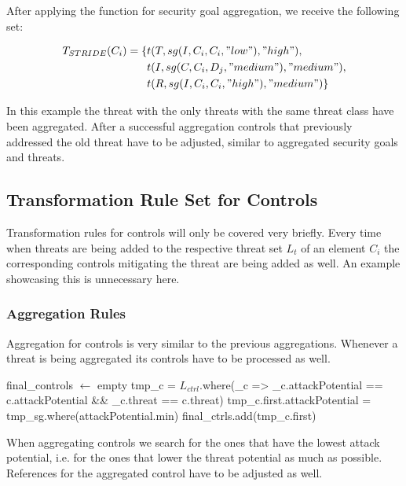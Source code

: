 After applying the function for security goal aggregation, we receive the following set:

\begin{align*}
T_{STRIDE}(C_i) = \{&t(T, sg(I,C_i,C_i,"low"), "high"),\\ 
&t(I, sg(C,C_i,D_j, "medium"), "medium"),\\ 
&t(R, sg(I,C_i,C_i,"high"), "medium") 
\}
\end{align*}

In this example the threat with the only threats with the same threat class have been aggregated. After a successful aggregation controls that previously addressed the old threat have to be adjusted, similar to aggregated security goals and threats.

\subsection{Transformation Rule Set for Controls}

Transformation rules for controls will only be covered very briefly. Every time when threats are being added to the respective threat set $L_t$ of an element $C_i$ the corresponding controls mitigating the threat are being added as well. An example showcasing this is unnecessary here. 

\subsubsection{Aggregation Rules}
\label{subsubsec:control_aggregation}

Aggregation for controls is very similar to the previous aggregations. Whenever a threat is being aggregated its controls have to be processed as well. 

\begin{algorithm}[H] 
\begin{algorithmic}
\State final\_controls $\gets$ empty
\State tmp\_c = $L_{ctrl}$.where(\_c => \_c.attackPotential == c.attackPotential  \&\& \_c.threat == c.threat)
\State tmp\_c.first.attackPotential = tmp\_sg.where(attackPotential.min)
\State final\_ctrls.add(tmp\_c.first)
\EndFor
\EndFunction
\end{algorithmic}
\end{algorithm}

When aggregating controls we search for the ones that have the lowest attack potential, i.e. for the ones that lower the threat potential as much as possible. References for the aggregated control have to be adjusted as well.

